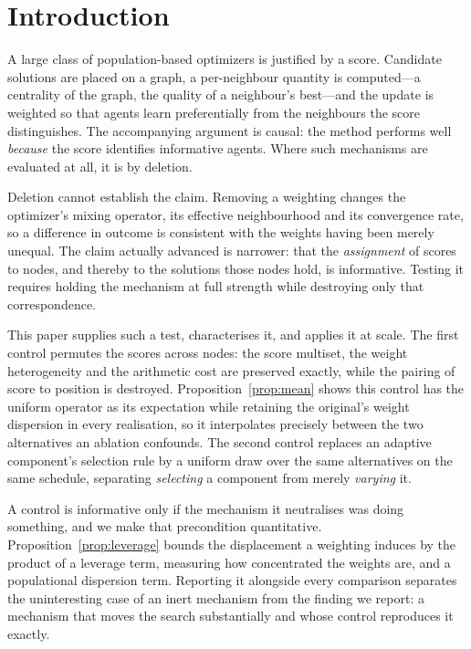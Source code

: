 \section{Introduction}
\label{sec:intro}

A large class of population-based optimizers is justified by a score. Candidate
solutions are placed on a graph, a per-neighbour quantity is computed---a
centrality of the graph, the quality of a neighbour's best---and the update is
weighted so that agents learn preferentially from the neighbours the score
distinguishes. The accompanying argument is causal: the method performs well
\emph{because} the score identifies informative agents. Where such mechanisms
are evaluated at all, it is by deletion.

Deletion cannot establish the claim. Removing a weighting changes the
optimizer's mixing operator, its effective neighbourhood and its convergence
rate, so a difference in outcome is consistent with the weights having been
merely unequal. The claim actually advanced is narrower: that the
\emph{assignment} of scores to nodes, and thereby to the solutions those nodes
hold, is informative. Testing it requires holding the mechanism at full
strength while destroying only that correspondence.

This paper supplies such a test, characterises it, and applies it at scale. The
first control permutes the scores across nodes: the score multiset, the weight
heterogeneity and the arithmetic cost are preserved exactly, while the pairing
of score to position is destroyed. Proposition~\ref{prop:mean} shows this
control has the uniform operator as its expectation while retaining the
original's weight dispersion in every realisation, so it interpolates precisely
between the two alternatives an ablation confounds. The second control replaces
an adaptive component's selection rule by a uniform draw over the same
alternatives on the same schedule, separating \emph{selecting} a component from
merely \emph{varying} it.

A control is informative only if the mechanism it neutralises was doing
something, and we make that precondition quantitative.
Proposition~\ref{prop:leverage} bounds the displacement a weighting induces by
the product of a leverage term, measuring how concentrated the weights are, and
a populational dispersion term. Reporting it alongside every comparison
separates the uninteresting case of an inert mechanism from the finding we
report: a mechanism that moves the search substantially and whose control
reproduces it exactly.

